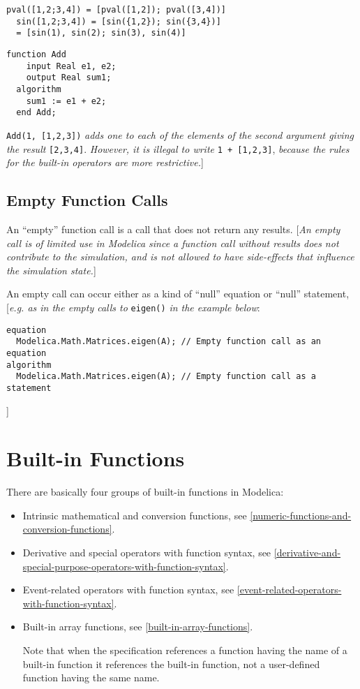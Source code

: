 \begin{lstlisting}[language=modelica]
  pval([1,2;3,4]) = [pval([1,2]); pval([3,4])]
  sin([1,2;3,4]) = [sin({1,2}); sin({3,4})]
  = [sin(1), sin(2); sin(3), sin(4)]
\end{lstlisting}
\begin{lstlisting}[language=modelica]
  function Add
    input Real e1, e2;
    output Real sum1;
  algorithm
    sum1 := e1 + e2;
  end Add;
\end{lstlisting}
\lstinline!Add(1, [1,2,3])! \emph{adds one to each of the elements of the second
argument giving the result} \lstinline![2,3,4]!. \emph{However, it is illegal to
write} \lstinline!1 + [1,2,3]!, \emph{because the rules for the built-in
operators are more restrictive.}{]}

\subsection{Empty Function Calls}

An ``empty'' function call is a call that does not return any results.
{[}\emph{An empty call is of limited use in Modelica since a function
call without results does not contribute to the simulation, and is not
allowed to have side-effects that influence the simulation state.}{]}

An empty call can occur either as a kind of ``null'' equation or
``null'' statement, {[}\emph{e.g. as in the empty calls to} \lstinline!eigen()!
\emph{in the example below}:

\begin{lstlisting}[language=modelica]
equation
  Modelica.Math.Matrices.eigen(A); // Empty function call as an equation
algorithm
  Modelica.Math.Matrices.eigen(A); // Empty function call as a statement
\end{lstlisting}
{]}

\section{Built-in Functions}

There are basically four groups of built-in functions in Modelica:

\begin{itemize}
\item
  Intrinsic mathematical and conversion functions, see \autoref{numeric-functions-and-conversion-functions}.
\item
  Derivative and special operators with function syntax,
  see \autoref{derivative-and-special-purpose-operators-with-function-syntax}.
\item
  Event-related operators with function syntax, see \autoref{event-related-operators-with-function-syntax}.
\item
  Built-in array functions, see \autoref{built-in-array-functions}.

  Note that when the specification references a function having the name
  of a built-in function it references the built-in function, not a
  user-defined function having the same name.
\end{itemize}

